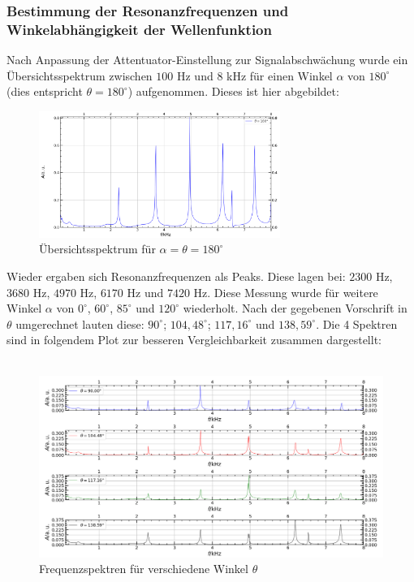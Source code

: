 \documentclass[german,  %
parskip=full,  %
]{scrartcl}
\begin{document}
\subsubsection{Bestimmung der Resonanzfrequenzen und Winkelabhängigkeit der Wellenfunktion}
Nach Anpassung der Attentuator-Einstellung zur Signalabschwächung wurde ein Übersichtsspektrum zwischen $100$ Hz und $8$ kHz für einen Winkel $\alpha$ von $180^{\circ}$ (dies entspricht $\theta = 180^{\circ}$) aufgenommen. Dieses ist hier abgebildet: 
\begin{figure}[h!]
\centering
\includegraphics[width = 0.7\textwidth]{4311}
\caption{Übersichtsspektrum für $\alpha = \theta = 180^{\circ}$}
\end{figure} 
\newpage
Wieder ergaben sich Resonanzfrequenzen als Peaks. Diese lagen bei: $2300$ Hz, $3680$ Hz, $4970$ Hz, $6170$ Hz und $7420$ Hz.
Diese Messung wurde für weitere Winkel $\alpha$ von  $0^{\circ}$, $60^{\circ}$, $85^{\circ}$ und $120^{\circ}$ wiederholt. Nach der gegebenen Vorschrift in $\theta$ umgerechnet lauten diese: $90^{\circ}$; $104,48^{\circ}$; $117,16^{\circ}$ und $138,59^{\circ}$. Die 4 Spektren sind in folgendem Plot zur besseren Vergleichbarkeit zusammen dargestellt: \\\\
\begin{figure}[h!]
\centering
\includegraphics[width=\textwidth]{4312.png}
\caption{Frequenzspektren für verschiedene Winkel $\theta$}
\end{figure} \\\\
\end{document}

